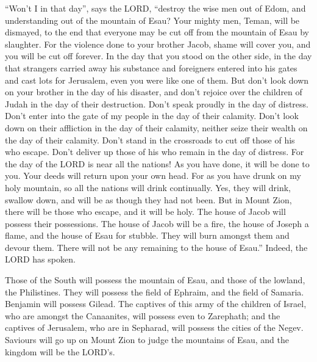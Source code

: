  ``Won't I in that day'', says the LORD, ``destroy the wise
men out of Edom, and understanding out of the mountain of Esau?
 Your mighty men, Teman, will be dismayed, to the end that
everyone may be cut off from the mountain of Esau by slaughter.
 For the violence done to your brother Jacob, shame will
cover you, and you will be cut off forever.  In the day
that you stood on the other side, in the day that strangers carried away
his substance and foreigners entered into his gates and cast lots for
Jerusalem, even you were like one of them.  But don't look
down on your brother in the day of his disaster, and don't rejoice over
the children of Judah in the day of their destruction. Don't speak
proudly in the day of distress.  Don't enter into the gate
of my people in the day of their calamity. Don't look down on their
affliction in the day of their calamity, neither seize their wealth on
the day of their calamity.  Don't stand in the crossroads
to cut off those of his who escape. Don't deliver up those of his who
remain in the day of distress.  For the day of the LORD is
near all the nations! As you have done, it will be done to you. Your
deeds will return upon your own head.  For as you have
drunk on my holy mountain, so all the nations will drink continually.
Yes, they will drink, swallow down, and will be as though they had not
been.  But in Mount Zion, there will be those who escape,
and it will be holy. The house of Jacob will possess their possessions.
 The house of Jacob will be a fire, the house of Joseph a
flame, and the house of Esau for stubble. They will burn amongst them
and devour them. There will not be any remaining to the house of Esau.''
Indeed, the LORD has spoken.

 Those of the South will possess the mountain of Esau, and
those of the lowland, the Philistines. They will possess the field of
Ephraim, and the field of Samaria. Benjamin will possess Gilead.
 The captives of this army of the children of Israel, who
are amongst the Canaanites, will possess even to Zarephath; and the
captives of Jerusalem, who are in Sepharad, will possess the cities of
the Negev.  Saviours will go up on Mount Zion to judge the
mountains of Esau, and the kingdom will be the LORD's.
